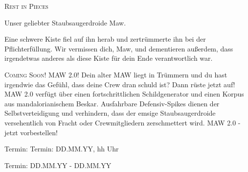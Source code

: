 \documentclass[final]{multiversum}
\begin{document}
\textsc{Rest in Pieces}
\begin{center}Unser geliebter Staubsaugerdroide Maw.\end{center} Eine schwere Kiste fiel auf ihn herab und zertrümmerte ihn bei der Pflichterfüllung.
Wir vermissen dich, Maw, und dementieren außerdem, dass irgendetwas anderes als diese Kiste für dein Ende verantwortlich war. 

\textsc{Coming Soon! MAW 2.0!}
Dein alter MAW liegt in Trümmern und du hast irgendwie das Gefühl, dass deine Crew dran schuld ist? 
Dann rüste jetzt auf! MAW 2.0 verfügt über einen fortschrittlichen Schildgenerator und einen Korpus aus mandalorianischem Beskar. Ausfahrbare Defensiv-Spikes dienen der Selbstverteidigung und verhindern, dass der emsige Staubsaugerdroide versehentlich von Fracht oder Crewmitgliedern zerschmettert wird. 
MAW 2.0 - jetzt vorbestellen!

\begin{termine}
\item Termin: Termin: DD.MM.YY, hh Uhr
  \item Termin: DD.MM.YY - DD.MM.YY
\end{termine}
\impressum
\end{document}
